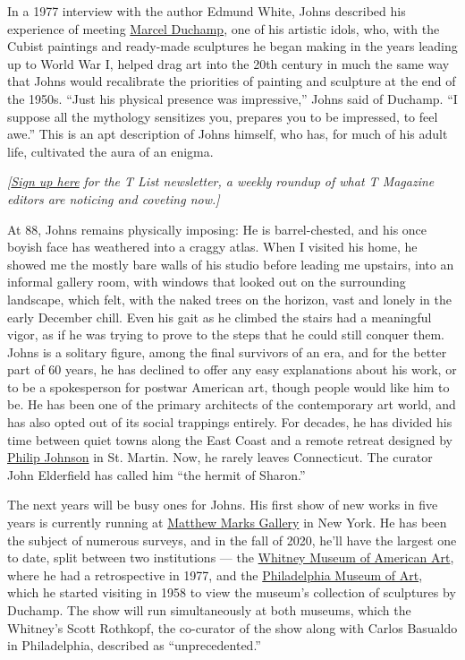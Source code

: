 In a 1977 interview with the author Edmund White, Johns described his
experience of meeting
\href{https://www.nytimes.com/topic/person/marcel-duchamp}{Marcel
Duchamp}, one of his artistic idols, who, with the Cubist paintings and
ready-made sculptures he began making in the years leading up to World
War I, helped drag art into the 20th century in much the same way that
Johns would recalibrate the priorities of painting and sculpture at the
end of the 1950s. ``Just his physical presence was impressive,'' Johns
said of Duchamp. ``I suppose all the mythology sensitizes you, prepares
you to be impressed, to feel awe.'' This is an apt description of Johns
himself, who has, for much of his adult life, cultivated the aura of an
enigma.

\emph{{[}}\href{https://www.nytimes.com/newsletters/t-list?module=inline}{\emph{Sign
up here}} \emph{for the T List newsletter, a weekly roundup of what T
Magazine editors are noticing and coveting now.{]}}

At 88, Johns remains physically imposing: He is barrel-chested, and his
once boyish face has weathered into a craggy atlas. When I visited his
home, he showed me the mostly bare walls of his studio before leading me
upstairs, into an informal gallery room, with windows that looked out on
the surrounding landscape, which felt, with the naked trees on the
horizon, vast and lonely in the early December chill. Even his gait as
he climbed the stairs had a meaningful vigor, as if he was trying to
prove to the steps that he could still conquer them. Johns is a solitary
figure, among the final survivors of an era, and for the better part of
60 years, he has declined to offer any easy explanations about his work,
or to be a spokesperson for postwar American art, though people would
like him to be. He has been one of the primary architects of the
contemporary art world, and has also opted out of its social trappings
entirely. For decades, he has divided his time between quiet towns along
the East Coast and a remote retreat designed by
\href{https://www.nytimes.com/2005/01/27/arts/design/philip-johnson-architectures-restless-intellect-dies-at-98.html}{Philip
Johnson} in St. Martin. Now, he rarely leaves Connecticut. The curator
John Elderfield has called him ``the hermit of Sharon.''

The next years will be busy ones for Johns. His first show of new works
in five years is currently running at
\href{https://www.matthewmarks.com/new-york/exhibitions/2019-02-09_jasper-johns/}{Matthew
Marks Gallery} in New York. He has been the subject of numerous surveys,
and in the fall of 2020, he'll have the largest one to date, split
between two institutions --- the
\href{https://www.nytimes.com/topic/organization/whitney-museum-of-american-art}{Whitney
Museum of American Art}, where he had a retrospective in 1977, and the
\href{https://www.nytimes.com/topic/organization/philadelphia-museum-of-art}{Philadelphia
Museum of Art}, which he started visiting in 1958 to view the museum's
collection of sculptures by Duchamp. The show will run simultaneously at
both museums, which the Whitney's Scott Rothkopf, the co-curator of the
show along with Carlos Basualdo in Philadelphia, described as
``unprecedented.''

